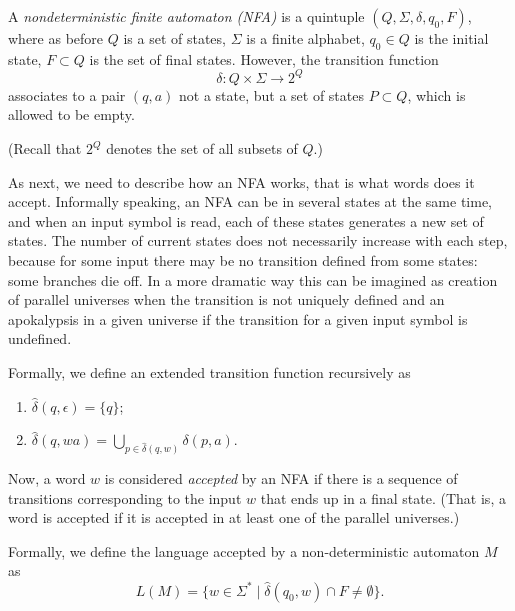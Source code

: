 \begin{page}
\setcounter{section}{1}
\setcounter{subsection}{3}
\setcounter{dfn}{6}
\label{portion:1032}

\begin{dfn}
A \emph{nondeterministic finite automaton (NFA)} is a quintuple $(Q, \Sigma, \delta, q_0, F)$, where as before
$Q$ is a set of states, $\Sigma$ is a finite alphabet, $q_0 \in Q$ is the initial state, $F \subset Q$ is the set of final states.
However, the transition function
\[
\delta \colon Q \times \Sigma \to 2^Q
\]
associates to a pair $(q,a)$ not a state, but a set of states $P \subset Q$, which is allowed to be empty.
\end{dfn}

\end{page}

\begin{page}
\setcounter{section}{1}
\setcounter{subsection}{3}
\setcounter{dfn}{6}
\label{portion:1033}

(Recall that $2^Q$ denotes the set of all subsets of $Q$.)

As next, we need to describe how an NFA works, that is what words does it accept.
Informally speaking, an NFA can be in several states at the same time, and when an input symbol is read, each of these states generates a new set of states.
The number of current states does not necessarily increase with each step, because for some input there may be no transition defined from some states:
some branches die off.
In a more dramatic way this can be imagined as creation of parallel universes when the transition is not uniquely defined
and an apokalypsis in a given universe if the transition for a given input symbol is undefined.

Formally, we define an extended transition function recursively as
\begin{enumerate}
\item
$\widehat{\delta}(q, \epsilon) = \{q\}$;
\item
$\widehat{\delta}(q, wa) = \bigcup\limits_{p \in \widehat{\delta}(q,w)} \delta(p, a)$.
\end{enumerate}

Now, a word $w$ is considered \emph{accepted} by an NFA if there is a sequence of transitions corresponding to the input $w$
that ends up in a final state.
(That is, a word is accepted if it is accepted in at least one of the parallel universes.)

Formally, we define the language accepted by a non-deterministic automaton $M$ as
\begin{equation}
\label{eqn:NFALanguage}
L(M) = \{w \in \Sigma^* \mid \widehat{\delta}(q_0, w) \cap F \ne \emptyset\}.
\end{equation}


\end{page}

